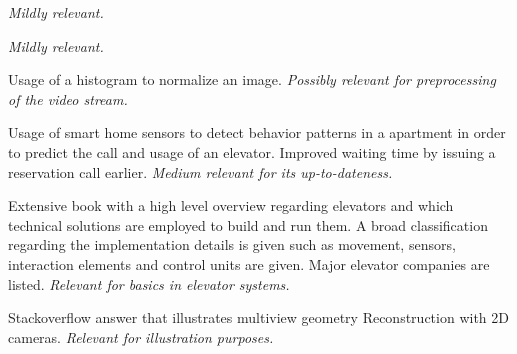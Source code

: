 


\emph{Mildly relevant.}

\emph{Mildly relevant.}





Usage of a histogram to normalize an image.
\emph{Possibly relevant for preprocessing of the video stream.}








Usage of smart home sensors to detect behavior patterns in a apartment in order to predict the call and usage of an elevator. Improved waiting time by issuing a reservation call earlier.
\emph{Medium relevant for its up-to-dateness.}


Extensive book with a high level overview regarding elevators and which technical solutions are employed to build and run them. A broad classification regarding the implementation details is given such as movement, sensors, interaction elements and control units are given. Major elevator companies are listed. \emph{Relevant for basics in elevator systems.}





Stackoverflow answer that illustrates multiview geometry Reconstruction with 2D cameras.
\emph{Relevant for illustration purposes.}

